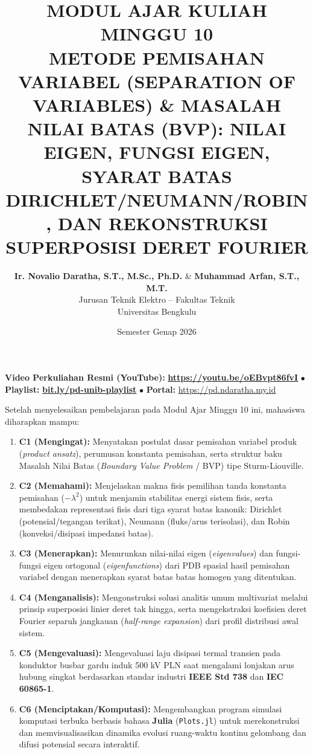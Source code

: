 \documentclass[11pt,a4paper]{article}
\title{\textbf{\Large MODUL AJAR KULIAH MINGGU 10}\\[0.3cm]
\textbf{\LARGE METODE PEMISAHAN VARIABEL (SEPARATION OF VARIABLES) \& MASALAH NILAI BATAS (BVP): NILAI EIGEN, FUNGSI EIGEN, SYARAT BATAS DIRICHLET/NEUMANN/ROBIN, DAN REKONSTRUKSI SUPERPOSISI DERET FOURIER}}
\author{\textbf{Ir. Novalio Daratha, S.T., M.Sc., Ph.D.} \& \textbf{Muhammad Arfan, S.T., M.T.} \\ 
Jurusan Teknik Elektro -- Fakultas Teknik \\ 
Universitas Bengkulu}
\date{Semester Genap 2026}
\theoremstyle{definition}
\begin{document}
\maketitle
\begin{center}
  \vspace{-0.25cm}
  \begin{tcolorbox}[colback=red!4!white,colframe=red!75!black,boxrule=0.5pt,arc=2pt,left=6pt,right=6pt,top=3pt,bottom=3pt,width=0.98\textwidth]
    \centering\footnotesize
    \textbf{Video Perkuliahan Resmi (YouTube):} {\color{red!80!black}\textbf{\url{https://youtu.be/oEBvpt86fvI}}} \quad $\bullet$ \quad \textbf{Playlist:} \href{https://www.youtube.com/playlist?list=PLS5oOZWXZeTw}{\color{blue!80!black}\textbf{bit.ly/pd-unib-playlist}} \quad $\bullet$ \quad \textbf{Portal:} \url{https://pd.ndaratha.my.id}
  \end{tcolorbox}
  \vspace{-0.15cm}
\end{center}


\begin{tcolorbox}[colback=blue!5!white,colframe=headercolor,title=\textbf{Capaian Pembelajaran Khusus (Sub-CPMK 5)}]
Setelah menyelesaikan pembelajaran pada Modul Ajar Minggu 10 ini, mahasiswa diharapkan mampu:
\begin{enumerate}[leftmargin=*]
    \item \textbf{C1 (Mengingat):} Menyatakan postulat dasar pemisahan variabel produk (\textit{product ansatz}), perumusan konstanta pemisahan, serta struktur baku Masalah Nilai Batas (\textit{Boundary Value Problem} / BVP) tipe Sturm-Liouville.
    \item \textbf{C2 (Memahami):} Menjelaskan makna fisis pemilihan tanda konstanta pemisahan ($-\lambda^2$) untuk menjamin stabilitas energi sistem fisis, serta membedakan representasi fisis dari tiga syarat batas kanonik: Dirichlet (potensial/tegangan terikat), Neumann (fluks/arus terisolasi), dan Robin (konveksi/disipasi impedansi batas).
    \item \textbf{C3 (Menerapkan):} Menurunkan nilai-nilai eigen (\textit{eigenvalues}) dan fungsi-fungsi eigen ortogonal (\textit{eigenfunctions}) dari PDB spasial hasil pemisahan variabel dengan menerapkan syarat batas batas homogen yang ditentukan.
    \item \textbf{C4 (Menganalisis):} Mengonstruksi solusi analitis umum multivariat melalui prinsip superposisi linier deret tak hingga, serta mengekstraksi koefisien deret Fourier separuh jangkauan (\textit{half-range expansion}) dari profil distribusi awal sistem.
    \item \textbf{C5 (Mengevaluasi):} Mengevaluasi laju disipasi termal transien pada konduktor busbar gardu induk 500 kV PLN saat mengalami lonjakan arus hubung singkat berdasarkan standar industri \textbf{IEEE Std 738} dan \textbf{IEC 60865-1}.
    \item \textbf{C6 (Menciptakan/Komputasi):} Mengembangkan program simulasi komputasi terbuka berbasis bahasa \textbf{Julia} (\texttt{Plots.jl}) untuk merekonstruksi dan memvisualisasikan dinamika evolusi ruang-waktu kontinu gelombang dan difusi potensial secara interaktif.
\end{enumerate}
\end{tcolorbox}
\end{document}
